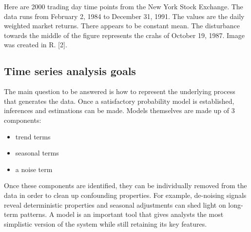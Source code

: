 \documentclass[12pt,a4paper]{article}
\begin{document}
Here are 2000 trading day time points from the New York Stock Exchange. The data runs from February 2, 1984 to December 31, 1991. The values are the daily weighted market returns. There appears to be constant mean. The disturbance towards the middle of the figure represents the crahs of October 19, 1987. Image was created in R. [2].

\subsection*{Time series analysis goals}
The main question to be answered is how to represent the underlying process that generates the data. Once a satisfactory probability model is established, inferences and estimations can be made. Models themselves are made up of 3 components:
\begin{itemize}
	\item trend terms
	\item seasonal terms
	\item a noise term
\end{itemize}
Once these components are identified, they can be individually removed from the data in order to clean up confounding properties. For example, de-noising signals reveal deterministic properties and seasonal adjustments can shed light on long-term patterns. A model is an important tool that gives analysts the most simplistic version of the system while still retaining its key features.
\end{document}

